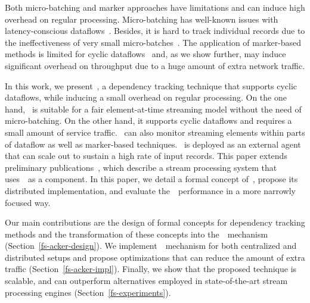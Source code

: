 Both micro-batching and marker approaches have limitations and can induce high overhead on regular processing. Micro-batching has well-known issues with latency-conscious dataflows~\cite{S7530084}. Besides, it is hard to track individual records due to the ineffectiveness of very small micro-batches~\cite{Zaharia:2012:DSE:2342763.2342773}. The application of marker-based methods is limited for cyclic dataflows~\cite{Carbone:2017:SMA:3137765.3137777} and, as we show further, may induce significant overhead on throughput due to a huge amount of extra network traffic.

In this work, we present~\tracker , a dependency tracking technique that supports cyclic dataflows, while inducing a small overhead on regular processing. On the one hand, \tracker\ is suitable for a fair element-at-time streaming model without the need of micro-batching. On the other hand, it supports cyclic dataflows and requires a small amount of service traffic. \tracker\ can also monitor streaming elements within parts of dataflow as well as marker-based techniques. \tracker\ is deployed as an external agent that can scale out to sustain a high rate of input records. This paper extends preliminary publications~\cite{we2018beyondmr, we2018adbis, thepaper}, which describe a stream processing system that uses~\tracker\ as a component. In this paper, we detail a formal concept of~\tracker , propose its distributed implementation, and evaluate the~\tracker\ performance in a more narrowly focused way.

Our main contributions are the design of formal concepts for dependency tracking methods and the transformation of these concepts into the~\tracker\ mechanism (Section~\ref{fs-acker-design}). We implement~\tracker\ mechanism for both centralized and distributed setups and propose optimizations that can reduce the amount of extra traffic (Section~\ref{fs-acker-impl}). Finally, we show that the proposed technique is scalable, and can outperform alternatives employed in state-of-the-art stream processing engines (Section~\ref{fs-experiments}).